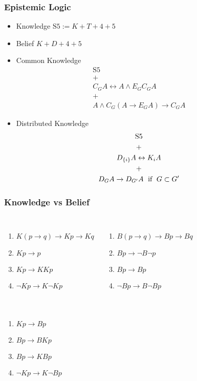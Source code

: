\documentclass[UTF8,aspectratio=43,11pt,colorlinks,compress,openany]{beamer}%
\begin{document}
\begin{frame}\frametitle{Epistemic Logic}
\setlength\abovedisplayskip{0pt}
\setlength\belowdisplayskip{0pt}
\begin{itemize}
	\item Knowledge $\mathrm{S5}:=K+T+4+5$\\
	\begin{center}
	\end{center}
	\item Belief $K+D+4+5$
	\item Common Knowledge\vspace{-2ex}
	\begin{gather*}
	\mathrm{S5}\\
	+\\
	C_G A\leftrightarrow A\wedge E_GC_G A\\
	+\\
	A\wedge C_G(A\to E_G A)\to C_G A
	\end{gather*}
	\item Distributed Knowledge\vspace{-1ex}
	\begin{gather*}
	\mathrm{S5}\\
	+\\
	D_{\{i\}}A\leftrightarrow K_i A\\
	+\\
	D_G A\to D_{G'} A \mbox{\; if \;} G\subset G'
	\end{gather*}
\end{itemize}
\end{frame}

\begin{frame}\frametitle{Knowledge vs Belief}
\begin{columns}
\begin{enumerate}
	\item $K(p\to q)\to Kp\to Kq$
	\item $Kp\to p$
	\item $Kp\to KKp$
	\item $\neg Kp\to K\neg Kp$
\end{enumerate}
\begin{enumerate}
	\item $B(p\to q)\to Bp\to Bq$
	\item $Bp\to\neg B\neg p$
	\item $Bp\to Bp$
	\item $\neg Bp\to B\neg Bp$
\end{enumerate}
\end{columns}
\begin{columns}
\begin{enumerate}
	\item $Kp\to Bp$
	\item $Bp\to BKp$
	\item $Bp\to KBp$
	\item $\neg Kp\to K\neg Bp$
\end{enumerate}
\centerline{}
\end{columns}
\end{frame}
\end{document}
